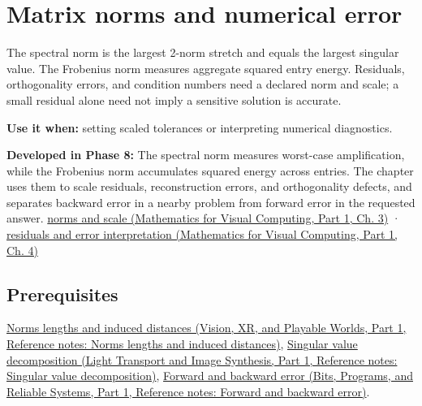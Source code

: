 \hypertarget{appendix-f8657bac66e5}{}\label{referencestart:appendix-f8657bac66e5}
\section{Matrix norms and numerical error}\label{appendix-f8657bac66e5-matrix-norms-and-numerical-error}

\hypertarget{appendix-f8657bac66e5-matrix-norms-and-numerical-error}{}

The spectral norm is the largest 2-norm stretch and equals the largest singular value. The Frobenius norm measures aggregate squared entry energy. Residuals, orthogonality errors, and condition numbers need a declared norm and scale; a small residual alone need not imply a sensitive solution is accurate.

\textbf{Use it when:} setting scaled tolerances or interpreting numerical diagnostics.

\textbf{Developed in Phase 8:} The spectral norm measures worst-case amplification, while the Frobenius norm accumulates squared energy across entries. The chapter uses them to scale residuals, reconstruction errors, and orthogonality defects, and separates backward error in a nearby problem from forward error in the requested answer. \href{../02-Mathematics-for-Visual-Computing-P01/main.pdf\#nameddest=01-foundations-i-ch019-matrix-norms-put-scale-into-error-statements}{norms and scale (Mathematics for Visual Computing, Part 1, Ch. 3)} · \href{../02-Mathematics-for-Visual-Computing-P01/main.pdf\#nameddest=01-foundations-i-ch020-residuals-distinguish-backward-accuracy-from-forward-certainty}{residuals and error interpretation (Mathematics for Visual Computing, Part 1, Ch. 4)}

\subsection{Prerequisites}\label{appendix-f8657bac66e5-prerequisites}

\hypertarget{appendix-f8657bac66e5-prerequisites}{}

\href{../07-Vision-XR-and-Playable-Worlds-P01/main.pdf\#nameddest=appendix-49933872bb51}{Norms lengths and induced distances (Vision, XR, and Playable Worlds, Part 1, Reference notes: Norms lengths and induced distances)}, \href{../04-Light-Transport-and-Image-Synthesis-P01/main.pdf\#nameddest=appendix-1fad5e7f36fa}{Singular value decomposition (Light Transport and Image Synthesis, Part 1, Reference notes: Singular value decomposition)}, \href{../01-Bits-Programs-and-Reliable-Systems-P01/main.pdf\#nameddest=appendix-a7fbaf6d1b1c}{Forward and backward error (Bits, Programs, and Reliable Systems, Part 1, Reference notes: Forward and backward error)}.

